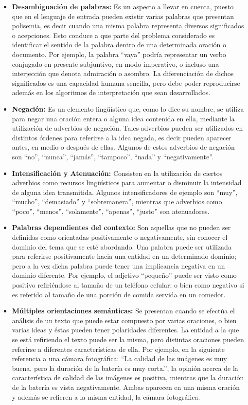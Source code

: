 {\begin{itemize}
\item \textbf{Desambiguaci\'on de palabras:} Es un aspecto a llevar en cuenta, puesto que en el lenguaje de entrada pueden existir varias palabras que presentan polisemia, es decir cuando una  misma palabra representa diversos significados o acepciones. Esto conduce a que parte del problema considerado es identificar 	el sentido de la palabra dentro de una determinada oraci\'on o documento. Por ejemplo, la palabra ``vaya'' podr\'ia representar un verbo conjugado en presente subjuntivo, en modo imperativo, o incluso una interjecci\'on que denota admiraci\'on o asombro. La diferenciaci\'on de dichos significados es una capacidad humana sencilla, pero debe poder reproducirse adem\'as en los algoritmos de interpretaci\'on que sean desarrollados.
\item \textbf{Negaci\'on:} Es un elemento ling\"u\'istico que, como lo dice su nombre, se utiliza para negar una oraci\'on entera o alguna idea contenida en ella, mediante la utilizaci\'on de adverbios de negaci\'on. Tales adverbios pueden ser utilizados en distintos \'ordenes para referirse a la idea negada, es decir pueden aparecer antes, en medio o despu\'es de ellas. Algunos de estos adverbios de negaci\'on son ``no'', ``nunca'', ``jam\'as'', ``tampoco'', ``nada'' y ``negativamente''.
\item \textbf{Intensificaci\'on y Atenuaci\'on:} Consisten en la utilizaci\'on de ciertos adverbios como recursos ling\"u\'isticos para aumentar o disminuir la intensidad de alguna idea transmitida.  Algunos intensificadores de ejemplo son ``muy'', ``mucho'', ``demasiado'' y ``sobremanera'',  mientras que adverbios como ``poco'', ``menos'', ``solamente'', ``apenas'', ``justo'' son atenuadores.
\item \textbf{Palabras dependientes del contexto:} Son aquellas que no pueden ser definidas como orientadas positivamente o negativamente, sin conocer el dominio del tema que se est\'e abordando. Una palabra puede ser utilizada para referirse positivamente hacia una entidad en un determinado dominio; pero a la vez dicha palabra puede tener una implicancia negativa en un dominio diferente.
Por ejemplo, el adjetivo ``peque\~no'' puede ser visto como positivo refiri\'endose al tama\~no de un tel\'efono celular; o bien como negativo si es referido al tama\~no de una porci\'on de comida servida en un comedor.
\item \textbf{M\'ultiples orientaciones sem\'anticas:} Se presentan cuando se efect\'ua el an\'alisis de un texto que puede estar compuesto por varias oraciones, o bien varias ideas y \'estas pueden tener polaridades diferentes. La entidad a la que se est\'a refiriendo el texto puede ser la misma, pero distintas oraciones pueden referirse a diferentes caracter\'isticas de ella.  Por ejemplo, en la siguiente referencia a una c\'amara fotogr\'afica: ``La calidad de las im\'agenes es muy buena, pero la duraci\'on de la bater\'ia es muy corta.'', la opini\'on acerca de la caracter\'istica de calidad de las im\'agenes es positiva, mientras que la duraci\'on de la bater\'ia es vista negativamente. Ambas aparecen en una misma oraci\'on y adem\'as se refieren a la misma entidad, la c\'amara fotogr\'afica.

\end{itemize}}
